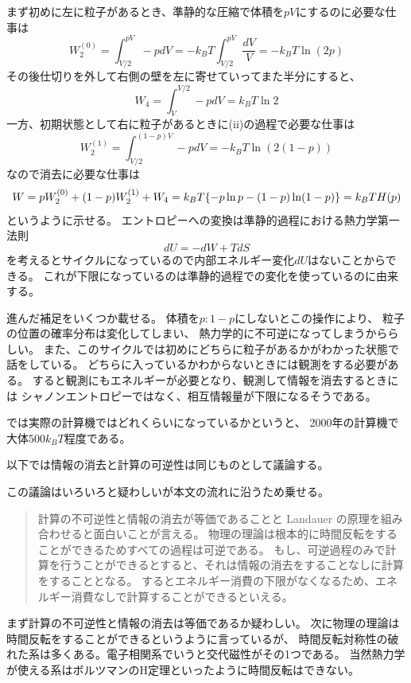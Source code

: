 \documentclass[../../master.tex]{subfiles}
\begin{document}
まず初めに左に粒子があるとき、準静的な圧縮で体積を\(pV\)にするのに必要な仕事は
\begin{equation*}
    W_2^{(0)} = \int_{V/2}^{pV} -pdV = -k_B T \int_{V/2}^{pV} \frac{dV}{V} = -k_B T \ln(2p)
\end{equation*}
その後仕切りを外して右側の壁を左に寄せていってまた半分にすると、
\begin{equation*}
    W_4 = \int_{V}^{V/2} -pdV = k_BT \ln 2
\end{equation*}
一方、初期状態として右に粒子があるときに(ii)の過程で必要な仕事は
\begin{equation*}
    W_2^{(1)} = \int_{V/2}^{(1-p)V}- pdV = -k_BT\ln(2(1-p))
\end{equation*}
なので消去に必要な仕事は
\begin{equation*}
    W = pW_2^{(0)} + (1-p)W_2^{(1)} + W_4 = k_B T \qty{-p\ln p - (1-p)\ln(1-p)} = k_B T H(p)
\end{equation*}
というように示せる。
エントロピーへの変換は準静的過程における熱力学第一法則
\begin{equation*}
    dU = -dW + TdS
\end{equation*}
を考えるとサイクルになっているので内部エネルギー変化\(dU\)はないことからできる。
これが下限になっているのは準静的過程での変化を使っているのに由来する。

進んだ補足をいくつか載せる。
体積を\(p:1-p\)にしないとこの操作により、
粒子の位置の確率分布は変化してしまい、
熱力学的に不可逆になってしまうかららしい。
また、このサイクルでは初めにどちらに粒子があるかがわかった状態で話をしている。
どちらに入っているかわからないときには観測をする必要がある。
すると観測にもエネルギーが必要となり、観測して情報を消去するときには
シャノンエントロピーではなく、相互情報量が下限になるそうである。

では実際の計算機ではどれくらいになっているかというと、
2000年の計算機で大体\(500k_B T\)程度である。

以下では情報の消去と計算の可逆性は同じものとして議論する。

この議論はいろいろと疑わしいが本文の流れに沿うため乗せる。
\begin{quotation}
    計算の不可逆性と情報の消去が等価であることと Landauer の原理を組み合わせると面白いことが言える。
    物理の理論は根本的に時間反転をすることができるためすべての過程は可逆である。
    もし、可逆過程のみで計算を行うことができるとすると、それは情報の消去をすることなしに計算をすることとなる。
    するとエネルギー消費の下限がなくなるため、エネルギー消費なしで計算することができるといえる。
\end{quotation}
まず計算の不可逆性と情報の消去は等価であるか疑わしい。
次に物理の理論は時間反転をすることができるというように言っているが、
時間反転対称性の破れた系は多くある。電子相関系でいうと交代磁性がその1つである。
当然熱力学が使える系はボルツマンのΗ定理といったように時間反転はできない。
\end{document}
